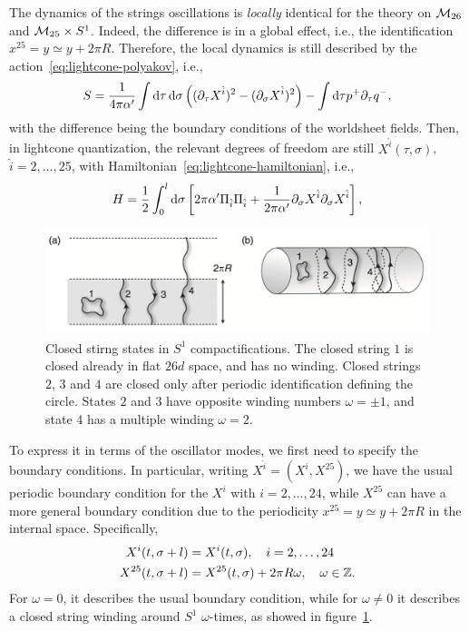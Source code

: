 The dynamics of the strings oscillations is \emph{locally} identical for the theory on $\mathcal{M}_{26}$ and $\mathcal{M}_{25} \times S^1$. Indeed, the difference is in a global effect, i.e., the identification $x^{25} = y \simeq y + 2\pi R$. Therefore, the local dynamics is still described by the action~\eqref{eq:lightcone-polyakov}, i.e.,
\begin{equation}
    S = \frac{1}{4\pi\alpha'} \int \mathop{}\!\mathrm{d} \tau \mathop{}\!\mathrm{d} \sigma \left( (\partial_\tau X^{\hat{i}})^2 - (\partial_\sigma X^{\hat{i}})^2 \right) - \int \mathop{}\!\mathrm{d} \tau p^+ \partial_\tau q^-,
\end{equation}
with the difference being the boundary conditions of the worldsheet fields. Then, in lightcone quantization, the relevant degrees of freedom are still $X^{\hat{i}}(\tau,\sigma)$, $\hat{i} = 2, \dots, 25$, with Hamiltonian~\eqref{eq:lightcone-hamiltonian}, i.e.,
\begin{equation}
    H = \frac{1}{2} \int_0^l \mathop{}\!\mathrm{d} \sigma \left[ 2\pi\alpha' \Pi_{\hat{i}} \Pi_{\hat{i}} + \frac{1}{2\pi\alpha'} \partial_\sigma X^{\hat{i}} \partial_\sigma X^{\hat{i}} \right],
\end{equation}

\begin{figure}
    \centering
    \includegraphics[width=\textwidth]{figures/winding.png}
    \caption{Closed stirng states in $S^1$ compactifications. The closed string $1$ is closed already in flat $26d$ space, and has no winding. Closed strings $2$, $3$ and $4$ are closed only after periodic identification defining the circle. States $2$ and $3$ have opposite winding numbers $\omega = \pm 1$, and state $4$ has a multiple winding $\omega = 2$.}
    \label{fig:winding}
\end{figure}

To express it in terms of the oscillator modes, we first need to specify the boundary conditions. In particular, writing $X^{\hat{i}} = (X^i, X^{25})$, we have the usual periodic boundary condition for the $X^i$ with $i = 2, \dots, 24$, while $X^{25}$ can have a more general boundary condition due to the periodicity $x^{25} = y \simeq y + 2\pi R$ in the internal space. Specifically,
\begin{subequations}
\begin{align}
    X^i(t,\sigma + l) &= X^i(t,\sigma), \quad i = 2, \dots, 24\\
    X^{25}(t,\sigma + l) &= X^{25}(t,\sigma) + 2\pi R \omega, \quad \omega \in \mathbb{Z}.
\end{align}
\end{subequations}
For $\omega = 0$, it describes the usual boundary condition, while for $\omega \neq 0$ it describes a closed string winding around $S^1$ $\omega$-times, as showed in figure~\ref{fig:winding}.

